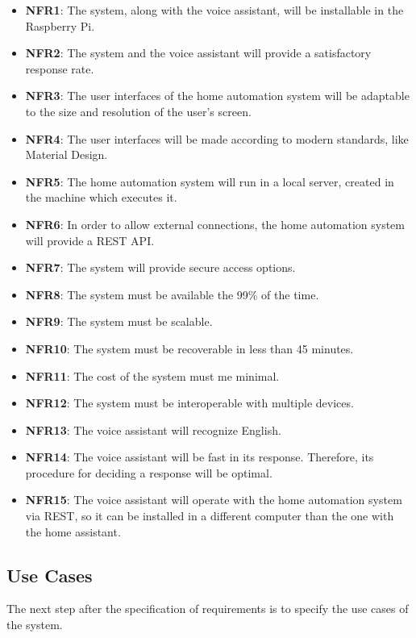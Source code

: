 \begin{itemize}
    \item \textbf{NFR1}: The system, along with the voice assistant, will be installable in the Raspberry Pi.
    \item \textbf{NFR2}: The system and the voice assistant will provide a satisfactory response rate.
    \item \textbf{NFR3}: The user interfaces of the home automation system will be adaptable to the size and resolution of the
    user's screen.
    \item \textbf{NFR4}: The user interfaces will be made according to modern standards, like Material Design.
    \item \textbf{NFR5}: The home automation system will run in a local server, created in the machine which executes it.
    \item \textbf{NFR6}: In order to allow external connections, the home automation system will provide a REST API.
    \item \textbf{NFR7}: The system will provide secure access options.
    \item \textbf{NFR8}: The system must be available the 99\% of the time.
    \item \textbf{NFR9}: The system must be scalable.
    \item \textbf{NFR10}: The system must be recoverable in less than 45 minutes.
    \item \textbf{NFR11}: The cost of the system must me minimal.
    \item \textbf{NFR12}: The system must be interoperable with multiple devices.
    \item \textbf{NFR13}: The voice assistant will recognize English.
    \item \textbf{NFR14}: The voice assistant will be fast in its response. Therefore, its procedure for deciding a response will
    be optimal.
    \item \textbf{NFR15}: The voice assistant will operate with the home automation system via REST, so it can be installed in a
    different computer than the one with the home assistant.
\end{itemize}

\subsection{Use Cases}
The next step after the specification of requirements is to specify the use cases of the system.

